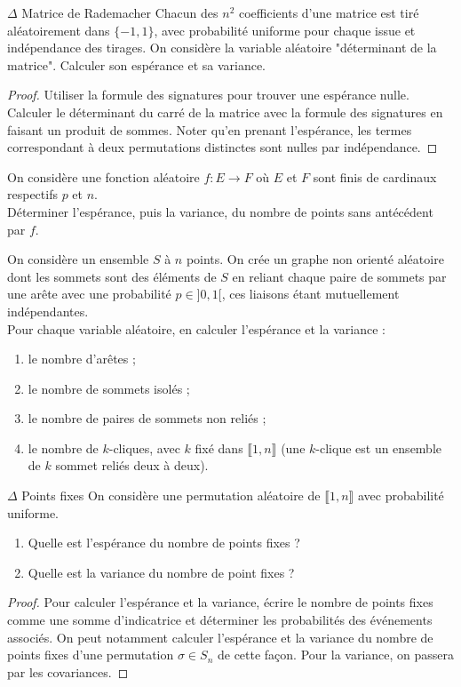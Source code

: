 \documentclass[french,a4paper]{article}
\theoremstyle{plain}
\theoremstyle{definition}
\theoremstyle{remark}
\begin{document}
\begin{ex}[Moulin.19]{$\Delta$	Matrice de Rademacher}
	Chacun des $n^2$ coefficients d'une matrice est tiré aléatoirement dans $\{-1,1\}$, avec probabilité uniforme pour chaque issue et indépendance des tirages. On considère la variable aléatoire "déterminant de la matrice". Calculer son espérance et sa variance.
\end{ex}
\begin{proof}
	Utiliser la formule des signatures pour trouver une espérance nulle. Calculer le déterminant du carré de la matrice avec la formule des signatures en faisant un produit de sommes. Noter qu'en prenant l'espérance, les termes correspondant à deux permutations distinctes sont nulles par indépendance.
\end{proof}

\begin{ex}[Moulin.20]{}
	On considère une fonction aléatoire $f:E\to F$ où $E$ et $F$ sont finis de cardinaux respectifs $p$ et $n$. \\ Déterminer l'espérance, puis la variance, du nombre de points sans antécédent par $f$.
\end{ex}

\begin{ex}[Moulin.21]{}
	On considère un ensemble $S$ à $n$ points. On crée un graphe non orienté aléatoire dont les sommets sont des éléments de $S$ en reliant chaque paire de sommets par une arête avec une probabilité $p\in]0,1[$, ces liaisons étant mutuellement indépendantes. \\ Pour chaque variable aléatoire, en calculer l'espérance et la variance :
	\begin{enumerate}
		\item le nombre d'arêtes ;
		\item le nombre de sommets isolés ;
		\item le nombre de paires de sommets non reliés ;
		\item le nombre de $k$-cliques, avec $k$ fixé dans $\llbracket1,n\rrbracket$ (une $k$-clique est un ensemble de $k$ sommet reliés deux à deux).
	\end{enumerate}
\end{ex}

\begin{ex}[Moulin.22]{$\Delta$ Points fixes}
	On considère une permutation aléatoire de $\llbracket1,n\rrbracket$ avec probabilité uniforme.
	\begin{enumerate}
		\item Quelle est l'espérance du nombre de points fixes ?
		\item Quelle est la variance du nombre de point fixes ?
	\end{enumerate}
\end{ex}
\begin{proof}
	Pour calculer l'espérance et la variance, écrire le nombre de points fixes comme une somme d'indicatrice et déterminer les probabilités des événements associés. On peut notamment calculer l'espérance et la variance du nombre de points fixes d'une permutation $\sigma\in S_n$ de cette façon. Pour la variance, on passera par les covariances.
\end{proof}
\end{document}
